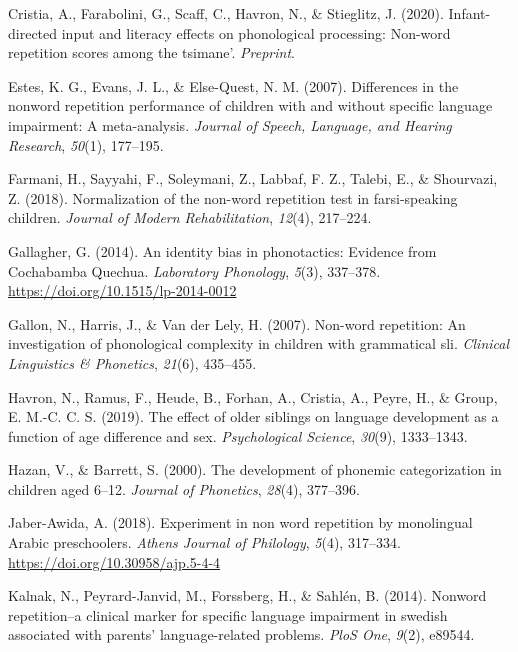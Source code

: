 \documentclass[english,,man,floatsintext]{apa6}
\begin{document}
\leavevmode\hypertarget{ref-cristia2020infant}{}%
Cristia, A., Farabolini, G., Scaff, C., Havron, N., \& Stieglitz, J. (2020). Infant-directed input and literacy effects on phonological processing: Non-word repetition scores among the tsimane'. \emph{Preprint}.

\leavevmode\hypertarget{ref-estes2007differences}{}%
Estes, K. G., Evans, J. L., \& Else-Quest, N. M. (2007). Differences in the nonword repetition performance of children with and without specific language impairment: A meta-analysis. \emph{Journal of Speech, Language, and Hearing Research}, \emph{50}(1), 177--195.

\leavevmode\hypertarget{ref-farmani2018normalization}{}%
Farmani, H., Sayyahi, F., Soleymani, Z., Labbaf, F. Z., Talebi, E., \& Shourvazi, Z. (2018). Normalization of the non-word repetition test in farsi-speaking children. \emph{Journal of Modern Rehabilitation}, \emph{12}(4), 217--224.

\leavevmode\hypertarget{ref-gallagher2014identity}{}%
Gallagher, G. (2014). An identity bias in phonotactics: Evidence from Cochabamba Quechua. \emph{Laboratory Phonology}, \emph{5}(3), 337--378. \url{https://doi.org/10.1515/lp-2014-0012}

\leavevmode\hypertarget{ref-gallon2007non}{}%
Gallon, N., Harris, J., \& Van der Lely, H. (2007). Non-word repetition: An investigation of phonological complexity in children with grammatical sli. \emph{Clinical Linguistics \& Phonetics}, \emph{21}(6), 435--455.

\leavevmode\hypertarget{ref-havron2019effect}{}%
Havron, N., Ramus, F., Heude, B., Forhan, A., Cristia, A., Peyre, H., \& Group, E. M.-C. C. S. (2019). The effect of older siblings on language development as a function of age difference and sex. \emph{Psychological Science}, \emph{30}(9), 1333--1343.

\leavevmode\hypertarget{ref-hazan2000development}{}%
Hazan, V., \& Barrett, S. (2000). The development of phonemic categorization in children aged 6--12. \emph{Journal of Phonetics}, \emph{28}(4), 377--396.

\leavevmode\hypertarget{ref-jabere2018xperiment}{}%
Jaber-Awida, A. (2018). Experiment in non word repetition by monolingual Arabic preschoolers. \emph{Athens Journal of Philology}, \emph{5}(4), 317--334. \url{https://doi.org/10.30958/ajp.5-4-4}

\leavevmode\hypertarget{ref-kalnak2014nonword}{}%
Kalnak, N., Peyrard-Janvid, M., Forssberg, H., \& Sahlén, B. (2014). Nonword repetition--a clinical marker for specific language impairment in swedish associated with parents' language-related problems. \emph{PloS One}, \emph{9}(2), e89544.
\end{document}
